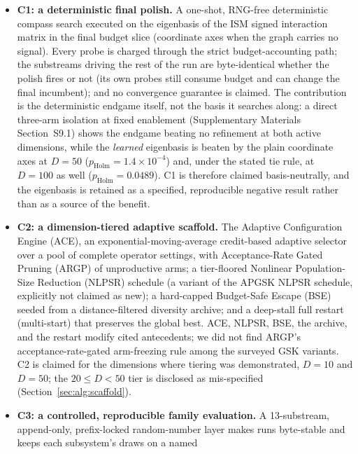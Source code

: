 \begin{itemize}[leftmargin=*,labelsep=4.9mm]
\item \textbf{C1: a deterministic final polish.} A one-shot, RNG-free
  deterministic compass search executed on the eigenbasis of the ISM
  signed interaction matrix in the final budget slice (coordinate axes
  when the graph carries no signal). Every probe is charged through
  the strict budget-accounting path; the substreams driving the rest of
  the run are byte-identical whether the polish fires or not (its own
  probes still consume budget and can change the final incumbent); and
  no convergence guarantee is claimed. The contribution is the deterministic
  endgame itself, not the basis it searches along: a direct three-arm isolation
  at fixed enablement (Supplementary Materials
  Section~S9.1) shows the endgame beating no refinement at
  both active dimensions, while the \emph{learned} eigenbasis is beaten by the
  plain coordinate axes at $D = 50$ ($p_{\mathrm{Holm}} = 1.4\times10^{-4}$)
  and, under the stated tie rule, at $D = 100$ as well
  ($p_{\mathrm{Holm}} = 0.0489$). C1 is therefore claimed
  basis-neutrally, and the eigenbasis is retained as a specified, reproducible
  negative result rather than as a source of the
  benefit. %
\item \textbf{C2: a dimension-tiered adaptive scaffold.} The
  Adaptive Configuration Engine (ACE), an exponential-moving-average
  credit-based adaptive selector over a pool of complete operator settings, with
  Acceptance-Rate Gated Pruning (ARGP) of unproductive arms; a
  tier-floored Nonlinear Population-Size Reduction (NLPSR) schedule
  (a variant of the APGSK NLPSR schedule, explicitly not claimed
  as new); a hard-capped Budget-Safe Escape (BSE) seeded from a distance-filtered
  diversity archive; and a deep-stall full restart (multi-start) that
  preserves the global best.
  ACE, NLPSR, BSE, the archive, and the restart modify cited
  antecedents; we did not find ARGP's acceptance-rate-gated arm-freezing
  rule among the surveyed GSK variants. C2 is claimed for the dimensions where
  tiering was demonstrated, $D = 10$ and $D = 50$; the $20 \leq D < 50$ tier is
  disclosed as mis-specified (Section~\ref{sec:alg:scaffold}). %
\item \textbf{C3: a controlled, reproducible family evaluation.} A
  13-substream, append-only, prefix-locked random-number layer makes
  runs byte-stable and keeps each subsystem's draws on a named

\end{itemize}
